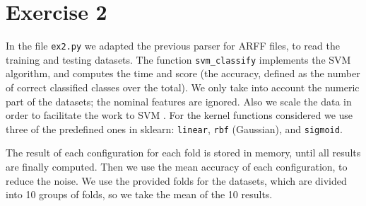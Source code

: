 \documentclass[a4paper]{article}
\begin{document}
\section{Exercise 2}
%
%
In the file \texttt{ex2.py} we adapted the previous parser for ARFF files, to 
read the training and testing datasets.
%
%
%
The function \texttt{svm\_classify} implements the SVM algorithm, and computes 
the time and score (the accuracy, defined as the number of correct classified 
classes over the total). We only take into account the numeric part of the 
datasets; the nominal features are ignored. Also we scale the data in order to 
facilitate the work to SVM \cite{scikit-tips}.
%
%
For the kernel functions considered we use three of the predefined ones in 
sklearn: \texttt{linear}, \texttt{rbf} (Gaussian), and \texttt{sigmoid}.
%
%

The result of each configuration for each fold is stored in memory, until all 
results are finally computed. Then we use the mean accuracy of each 
configuration, to reduce the noise. We use the provided folds for the datasets, 
which are divided into 10 groups of folds, so we take the mean of the 10 
results.
%
%
\end{document}
